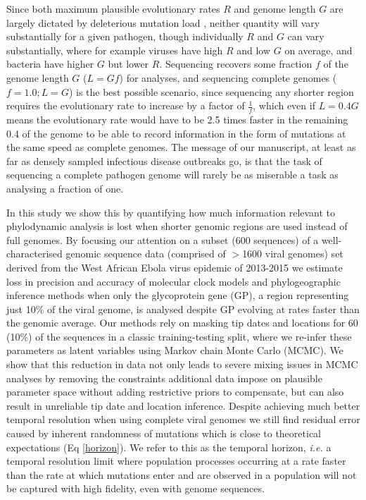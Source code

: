 \documentclass{bmcart}
\begin{document}
Since both maximum plausible evolutionary rates $R$ and genome length $G$ are largely dictated by deleterious mutation load \cite{gago_extremely_2009}, neither quantity will vary substantially for a given pathogen, though individually $R$ and $G$ can vary substantially, where for example viruses have high $R$ and low $G$ on average, and bacteria have higher $G$ but lower $R$.
Sequencing recovers some fraction $f$ of the genome length $G$ ($L=Gf$) for analyses, and sequencing complete genomes ($f=1.0; L = G$) is the best possible scenario, since sequencing any shorter region requires the evolutionary rate to increase by a factor of $\frac{1}{f}$, which even if $L = 0.4 G$ means the evolutionary rate would have to be 2.5 times faster in the remaining 0.4 of the genome to be able to record information in the form of mutations at the same speed as complete genomes.
The message of our manuscript, at least as far as densely sampled infectious disease outbreaks go, is that the task of sequencing a complete pathogen genome will rarely be as miserable a task as analysing a fraction of one.

In this study we show this by quantifying how much information relevant to phylodynamic analysis is lost when shorter genomic regions are used instead of full genomes.
By focusing our attention on a subset (600 sequences) of a well-characterised genomic sequence data (comprised of $>$1600 viral genomes) set derived from the West African Ebola virus epidemic of 2013-2015 \cite{dudas_virus_2017} we estimate loss in precision and accuracy of molecular clock models and phylogeographic inference methods when only the glycoprotein gene (GP), a region representing just 10\% of the viral genome, is analysed despite GP evolving at rates faster than the genomic average.
Our methods rely on masking tip dates and locations for 60 (10\%) of the sequences in a classic training-testing split, where we re-infer these parameters as latent variables using Markov chain Monte Carlo (MCMC).
We show that this reduction in data not only leads to severe mixing issues in MCMC analyses by removing the constraints additional data impose on plausible parameter space without adding restrictive priors to compensate, but can also result in unreliable tip date and location inference.
Despite achieving much better temporal resolution when using complete viral genomes we still find residual error caused by inherent randomness of mutations which is close to theoretical expectations (Eq \ref{horizon}).
We refer to this as the temporal horizon, \textit{i.e.} a temporal resolution limit where population processes occurring at a rate faster than the rate at which mutations enter and are observed in a population will not be captured with high fidelity, even with genome sequences.
\end{document}
